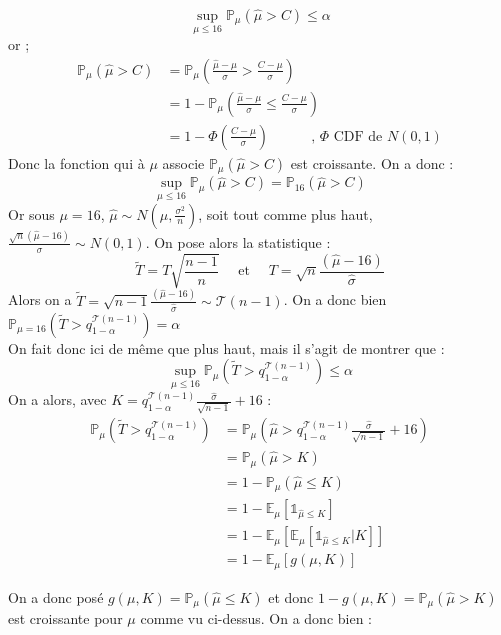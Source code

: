 \documentclass[a4paper,10pt]{report}
\begin{document}
$$
\sup_{\mu \leq 16} \mathbb{P}_\mu (\hat{\mu} > C) \leq \alpha
$$
or ;
$$
\begin{aligned}
\mathbb{P}_\mu (\hat{\mu} > C) & = \mathbb{P}_\mu \left(\frac{\hat{\mu} - \mu}{\sigma} > \frac{C - \mu}{\sigma}\right) \\
& = 1 - \mathbb{P}_\mu \left(\frac{\hat{\mu} - \mu}{\sigma} \leq \frac{C - \mu}{\sigma}\right) \\
& = 1 - \Phi \left(  \frac{C - \mu}{\sigma}  \right) \quad \quad \quad \text{, }\Phi \text{ CDF de } N(0,1)
\end{aligned}
$$
Donc la fonction qui à $\mu$ associe $\mathbb{P}_\mu (\hat{\mu} > C)$ est croissante. On a donc :
$$
\sup_{\mu \leq 16} \mathbb{P}_\mu (\hat{\mu} > C) = \mathbb{P}_{16} (\hat{\mu} > C)
$$
Or sous $\mu = 16$, $\hat{\mu} \sim N(\mu, \frac{\sigma^2}{n})$, soit tout comme plus haut, $\frac{\sqrt{n}(\hat{\mu}-16)}{\sigma} \sim N(0,1)$. On pose alors la statistique :
$$
\tilde{T} = T  \sqrt{\frac{n-1}{n}}  \quad \text{ et } \quad T = \sqrt{n} \frac{(\hat{\mu} - 16)}{\hat{\sigma}}
$$
Alors on a $\tilde{T} =  \sqrt{n-1} \frac{(\hat{\mu} - 16)}{\hat{\sigma}} \sim \mathcal{T}(n-1)$. On a donc bien $\mathbb{P}_{\mu = 16} \left(\tilde{T} > q_{1-\alpha}^{\mathcal{T}(n-1)}\right) = \alpha$\\
\newline
On fait donc ici de même que plus haut, mais il s'agit de montrer que :
$$
\sup_{\mu \leq 16} \mathbb{P}_\mu \left(\tilde{T} > q_{1-\alpha}^{\mathcal{T}(n-1)}\right) \leq \alpha
$$
On a alors, avec $K = q_{1-\alpha}^{\mathcal{T}(n-1)}  \frac{\hat{\sigma}}{\sqrt{n-1}}  + 16$ : 
$$
\begin{aligned}
\mathbb{P}_\mu \left(\tilde{T} > q_{1-\alpha}^{\mathcal{T}(n-1)}\right)
& = \mathbb{P}_\mu \left(\hat{\mu} > q_{1-\alpha}^{\mathcal{T}(n-1)}  \frac{\hat{\sigma}}{\sqrt{n-1}}  + 16  \right)\\
& = \mathbb{P}_\mu \left(\hat{\mu} > K \right)\\
& = 1 - \mathbb{P}_\mu \left(\hat{\mu} \leq K \right)\\
& = 1 - \mathbb{E}_\mu \left[ \mathds{1}_{\hat{\mu} \leq K} \right] \\
& = 1 - \mathbb{E}_\mu \left[ \mathbb{E}_\mu \left[ \mathds{1}_{\hat{\mu} \leq K} | K \right] \right] \\
& = 1 - \mathbb{E}_\mu \left[ g(\mu,K) \right]
\end{aligned}
$$

On a donc posé $g(\mu,K) = \mathbb{P}_\mu \left( \hat{\mu} \leq K \right)$ et donc $1 - g(\mu,K) = \mathbb{P}_\mu \left( \hat{\mu} > K \right)$ est croissante pour $\mu$ comme vu ci-dessus.
On a donc bien :
\end{document}
